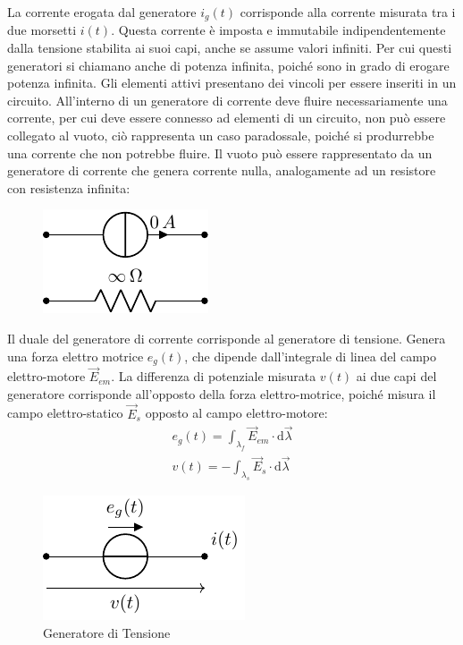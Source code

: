 \documentclass{article}
\newcommand{\df}{\mathrm{d}}
\numberwithin{equation}{subsection}
\begin{document}
La corrente erogata dal generatore $i_g(t)$ corrisponde alla corrente misurata tra i due morsetti $i(t)$. Questa corrente è imposta e immutabile indipendentemente dalla tensione 
stabilita ai suoi capi, anche se assume valori infiniti. Per cui questi generatori si chiamano anche di potenza infinita, poiché sono in grado di erogare potenza infinita. 
Gli elementi attivi presentano dei vincoli per essere inseriti in un circuito. All'interno di un generatore di corrente deve fluire necessariamente una corrente, per cui deve 
essere connesso ad elementi di un circuito, non può essere collegato al vuoto, ciò rappresenta un caso paradossale, poiché si produrrebbe una corrente che non potrebbe fluire. 
Il vuoto può essere rappresentato da un generatore di corrente che genera corrente nulla, analogamente ad un resistore con resistenza infinita: 
\begin{figure}[H]%
    \centering
    \includegraphics{vuoto.pdf}
    \label{fig:vuoto}
\end{figure}


Il duale del generatore di corrente corrisponde al generatore di tensione. Genera una forza elettro motrice $e_g(t)$, che dipende dall'integrale di linea del campo 
elettro-motore $\vec{E}_{em}$. La differenza di potenziale misurata $v(t)$ ai due capi del generatore corrisponde all'opposto della forza elettro-motrice, poiché misura il 
campo elettro-statico $\vec{E}_s$ opposto al campo elettro-motore: 
\begin{gather*}
    e_g(t)=\displaystyle\int_{\lambda_f}\vec{E}_{em}\cdot \df\vec{\lambda}\\
    v(t)=-\displaystyle\int_{\lambda_s}\vec{E}_s\cdot \df\vec{\lambda}
\end{gather*}
\begin{figure}[H]%
    \centering
    \includegraphics{generatore-tensione.pdf}
    \caption{Generatore di Tensione}
    \label{fig:generatore-tensione}
\end{figure}
\end{document}
